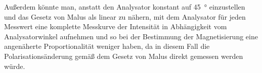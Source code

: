 \documentclass[
	a4paper,
	12pt,
	pagesize,
	ngerman
]{scrartcl}
\begin{document}
	Außerdem könnte man, anstatt den Analysator konstant auf \SI{45}{\degree} einzustellen und das Gesetz von Malus als linear zu nähern, mit dem Analysator für jeden Messwert eine komplette Messkurve der Intensität in Abhängigkeit vom Analysatorwinkel aufnehmen und so bei der Bestimmung der Magnetisierung eine angenäherte Proportionalität weniger haben, da in diesem Fall die Polarisationsänderung gemäß dem Gesetz von Malus direkt gemessen werden würde. %
\end{document}
